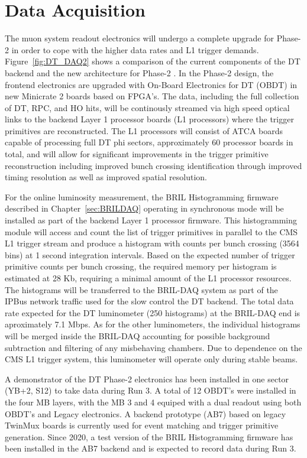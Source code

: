 \section{Data Acquisition}

The muon system readout electronics will undergo a complete upgrade for Phase-2 in order to cope with the higher data rates and L1 trigger demands.
Figure~\ref{fig:DT_DAQ2} shows a comparison of the current components of the DT backend and the new architecture for Phase-2 \cite{CERN-LHCC-2017-012}.
In the Phase-2 design, the frontend electronics are upgraded with On-Board Electronics for DT (OBDT) in new Minicrate 2 boards based on FPGA's.
The data, including the full collection of DT, RPC, and HO hits, will be continously streamed via high speed optical
links to the backend Layer 1 processor boards (L1 processors) where the trigger primitives are reconstructed.
The L1 processors will consist of ATCA boards capable of processing full DT phi sectors, approximately 60 processor boards in total,
and will allow for significant improvements in the trigger primitive reconstruction including improved bunch crossing identification
through improved timing resolution as well as improved spatial resolution. 


For the online luminosity measurement, the BRIL Histogramming firmware described in Chapter~\ref{sec:BRILDAQ} operating in synchronous mode will be installed as part of the backend Layer 1 processor firmware.
This histogramming module will access and count the list of trigger primitives in parallel to the CMS L1 trigger stream
and produce a histogram with counts per bunch crossing (3564 bins) at 1 second integration intervals.
Based on the expected number of trigger primitive counts per bunch crossing, the required memory per histogram is estimated at 28 Kb, requiring a minimal amount of the L1 processor resources. 
The histograms  will be transferred to the BRIL-DAQ system as part of the IPBus network traffic used for the slow control the DT backend.
The total data rate expected for the DT luminometer (250 histograms) at the BRIL-DAQ end is aproximately 7.1 Mbps.
As for the other luminometers, the individual histograms will be merged inside the BRIL-DAQ accounting for possible background subtraction and filtering of any misbehaving chambers.
Due to dependence on the CMS L1 trigger system, this luminometer will operate only during stable beams.

A demonstrator of the DT Phase-2 electronics has been installed in one sector (YB+2, S12) to take data during Run 3.
A total of 12 OBDT's were installed in the four MB layers, with the MB 3 and 4 equiped with a dual readout using both OBDT's and Legacy electronics.
A backend prototype (AB7) based on legacy TwinMux boards is currently used for event matching and trigger primitive generation.
Since 2020, a test version of the BRIL Histogramming firmware has been installed in the AB7 backend and is expected to record data during Run 3.



